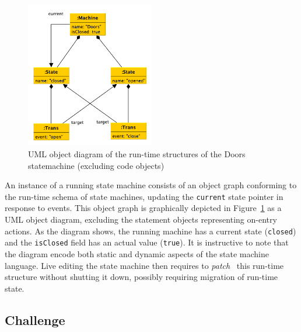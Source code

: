 \documentclass[english,submission]{programming}
\begin{document}
\begin{figure}[t]
  \centering
\includegraphics[width=0.5\textwidth]{figures/doorsmachine.pdf}
\caption{UML object diagram of the run-time structures of the Doors statemachine (excluding code objects)}
\label{FIG:doorsRuntime}
\end{figure}


An instance of a running state machine consists of an object graph conforming to the run-time schema of state machines, updating the \lstinline{current} state pointer in response to events. This object graph is graphically depicted in Figure~\ref{FIG:doorsRuntime} as a UML object diagram, excluding the statement objects representing on-entry actions. As the diagram shows, the running machine has a current state (\lstinline{closed}) and the \lstinline{isClosed} field has an actual value (\lstinline{true}). It is instructive to note that the diagram encode both static and dynamic aspects of the state machine language. Live editing the state machine then requires to \textit{patch}~\cite{SemanticDeltas} this run-time structure without shutting it down, possibly requiring migration of run-time state.

\subsection{Challenge}
\end{document}
